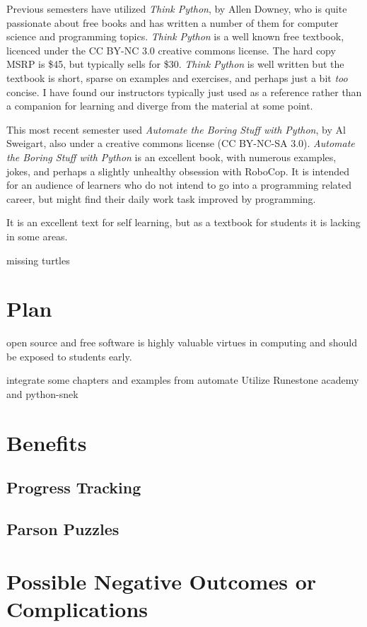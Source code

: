 \documentclass[]{article}
\begin{document}
Previous semesters have utilized \textit{Think Python}, by Allen Downey, who is quite passionate about free books and has written a number of them for computer science and programming topics.
\textit{Think Python} is a well known free textbook, licenced under the CC BY-NC 3.0 creative commons license.  The hard copy MSRP is  \$45, but typically sells for \$30.
\textit{Think Python} is well written but the textbook is short, sparse on examples and exercises, and perhaps just a bit \textit{too} concise.
I have found our instructors typically just used as a reference rather than a companion for learning and diverge from the material at some point.

This most recent semester used \textit{Automate the Boring Stuff with Python}, by Al Sweigart, also under a creative commons license (CC BY-NC-SA 3.0).
\textit{Automate the Boring Stuff with Python} is an excellent book, with numerous examples, jokes, and perhaps a slightly unhealthy obsession with RoboCop.
It is intended for an audience of learners who do not intend to go into a programming related career, but might find their daily work task improved by programming.

It is an excellent text for self learning, but as a textbook for students it is lacking in some areas.  


missing turtles

\section{Plan}
open source and free software is highly valuable virtues in computing and should be exposed to students early.

integrate some chapters and examples from automate 
Utilize Runestone academy and python-snek

\section{Benefits}

\subsection{Progress Tracking}

\subsection{Parson Puzzles}



\section{Possible Negative Outcomes or Complications}
\end{document}
